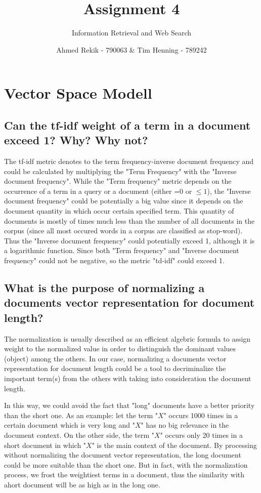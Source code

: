 \documentclass{scrartcl}
\title{Assignment 4}
\subtitle{Information Retrieval and Web Search}
\author{Ahmed Rekik - 790063 \& Tim Henning - 789242}
\begin{document}
\maketitle

\setcounter{section}{0}
\section{Vector Space Modell}

\subsection{Can the tf-idf weight of a term in a document exceed 1? Why? Why not? }

The tf-idf metric denotes to the term frequency-inverse document frequency and could be calculated by multiplying the "Term Frequency" with the "Inverse document frequency". While the "Term frequency" metric depends on the occurrence of a term in a query or a document (either =0 or $\leq 1$), the "Inverse document frequency" could be potentially a big value since it depends on the document quantity in which occur certain specified term. This quantity of documents is mostly of times much less than the number of all documents in the corpus (since all most occured words in a corpus are classified as stop-word). Thus the "Inverse document frequency" could potentially exceed 1, although it is a logarithmic function. Since both "Term frequency" and "Inverse document frequency" could not be negative, so the metric "td-idf" could exceed 1.



\subsection{What is the purpose of normalizing a documents vector representation for document length? }

The normalization is usually described as an efficient algebric formula to assign weight to the normalized value in order to distinguish the dominant values (object) among the others. In our case, normalizing a documents vector representation for document length could be a tool to decriminalize the important term(s) from the others with taking into consideration the document length.

 In this way, we could avoid the fact that "long" documents have a better priority than the short one. As an example: let the term "$X$" occurs 1000 times in a certain document which is very long and "$X$" has no big relevance in the document context. On the other side, the term "$X$" occurs only 20 times in a short document in which "$X$" is the main context of the document. By processing without normalizing the document vector representation, the long document could be more suitable than the short one. But in fact, with the normalization process, we frost the weightiest terms in a document, thus the similarity with ahort document will be as high as in the long one.
\end{document}
